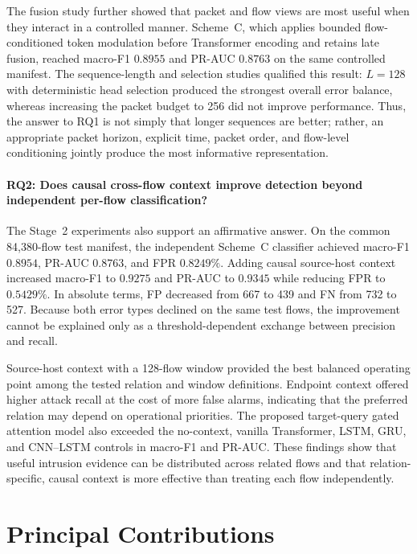 The fusion study further showed that packet and flow views are most useful when
they interact in a controlled manner. Scheme~C, which applies bounded
flow-conditioned token modulation before Transformer encoding and retains late
fusion, reached macro-F1 $0.8955$ and PR-AUC $0.8763$ on the same controlled
manifest. The sequence-length and selection studies qualified this result:
$L=128$ with deterministic head selection produced the strongest overall error
balance, whereas increasing the packet budget to 256 did not improve
performance. Thus, the answer to RQ1 is not simply that longer sequences are
better; rather, an appropriate packet horizon, explicit time, packet order, and
flow-level conditioning jointly produce the most informative representation.

\paragraph{RQ2: Does causal cross-flow context improve detection beyond
independent per-flow classification?}
The Stage~2 experiments also support an affirmative answer. On the common
84,380-flow test manifest, the independent Scheme~C classifier achieved
macro-F1 $0.8954$, PR-AUC $0.8763$, and FPR $0.8249\%$. Adding causal
source-host context increased macro-F1 to $0.9275$ and PR-AUC to $0.9345$ while
reducing FPR to $0.5429\%$. In absolute terms, FP decreased from 667 to 439 and
FN from 732 to 527. Because both error types declined on the same test flows,
the improvement cannot be explained only as a threshold-dependent exchange
between precision and recall.

Source-host context with a 128-flow window provided the best balanced operating
point among the tested relation and window definitions. Endpoint context
offered higher attack recall at the cost of more false alarms, indicating that
the preferred relation may depend on operational priorities. The proposed
target-query gated attention model also exceeded the no-context, vanilla
Transformer, LSTM, GRU, and CNN--LSTM controls in macro-F1 and PR-AUC. These
findings show that useful intrusion evidence can be distributed across related
flows and that relation-specific, causal context is more effective than treating
each flow independently.

\section{Principal Contributions}
\label{subsec:conclusion_contributions}

